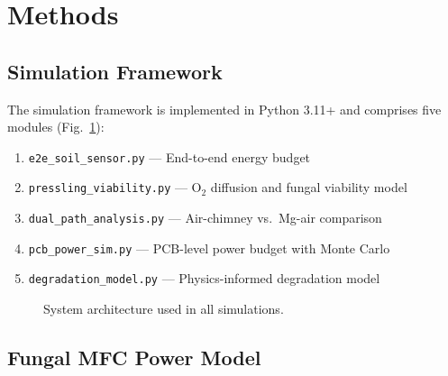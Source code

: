\documentclass[twocolumn,10pt,a4paper]{article}
\begin{document}
\section{Methods}
\label{sec:methods}

\subsection{Simulation Framework}

The simulation framework is implemented in Python 3.11+ and comprises five
modules (Fig.~\ref{fig:framework}):
\begin{enumerate}
    \item \texttt{e2e\_soil\_sensor.py} — End-to-end energy budget
    \item \texttt{pressling\_viability.py} — O$_2$ diffusion and fungal
          viability model
    \item \texttt{dual\_path\_analysis.py} — Air-chimney vs.\ Mg-air comparison
    \item \texttt{pcb\_power\_sim.py} — PCB-level power budget with Monte Carlo
    \item \texttt{degradation\_model.py} — Physics-informed degradation model
\end{enumerate}

\begin{figure}[H]
\centering
{}
\caption{System architecture used in all simulations.}
\label{fig:framework}
\end{figure}

\subsection{Fungal MFC Power Model}
\end{document}
